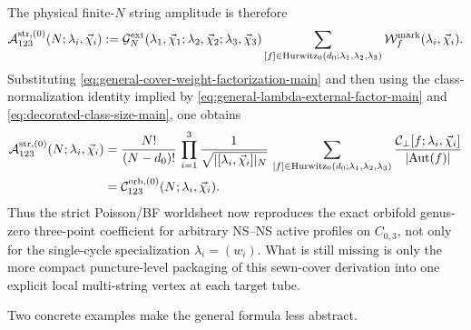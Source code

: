 \documentclass[11pt]{article}
\newcommand{\mc}[1]{\mathcal{#1}}
\begin{document}
The physical finite-$N$ string amplitude is therefore
\begin{equation}\label{eq:general-string-three-point-main}
\mc A_{123}^{\rm str,(0)}(N;\lambda_i,\vec\chi_i)
:=
\mc G_N^{\rm ext}(\lambda_1,\vec\chi_1;\lambda_2,\vec\chi_2;\lambda_3,\vec\chi_3)
\sum_{[f]\in \mathrm{Hurwitz}_0(d_0;\lambda_1,\lambda_2,\lambda_3)}
\mc W_f^{\rm mark}(\lambda_i,\vec\chi_i).
\end{equation}
Substituting \eqref{eq:general-cover-weight-factorization-main} and then using the class-normalization identity implied by \eqref{eq:general-lambda-external-factor-main} and \eqref{eq:decorated-class-size-main}, one obtains
\begin{equation}\label{eq:general-string-orbifold-match}
\begin{aligned}
\mc A_{123}^{\rm str,(0)}(N;\lambda_i,\vec\chi_i)
&=
\frac{N!}{(N-d_0)!}\,
\prod_{i=1}^3 \frac{1}{\sqrt{|[\lambda_i,\vec\chi_i]|_N}}\,
\sum_{[f]\in \mathrm{Hurwitz}_0(d_0;\lambda_1,\lambda_2,\lambda_3)}
\frac{\mc C_\perp[f;\lambda_i,\vec\chi_i]}{|\mathrm{Aut}(f)|}
\\
&=
\mc C_{123}^{\rm orb,(0)}(N;\lambda_i,\vec\chi_i).
\end{aligned}
\end{equation}
Thus the strict Poisson/BF worldsheet now reproduces the exact orbifold genus-zero three-point coefficient for arbitrary NS--NS active profiles on $C_{0,3}$, not only for the single-cycle specialization $\lambda_i=(w_i)$. What is still missing is only the more compact puncture-level packaging of this sewn-cover derivation into one explicit local multi-string vertex at each target tube.

Two concrete examples make the general formula less abstract.
\end{document}
